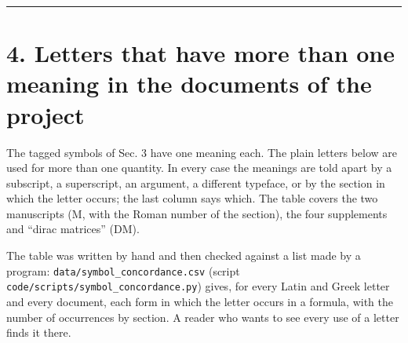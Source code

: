 \documentclass[
  10pt,
]{article}
\begin{document}
\begin{center}\rule{0.5\linewidth}{0.5pt}\end{center}

\hypertarget{letters-that-have-more-than-one-meaning-in-the-documents-of-the-project}{%
\section{4. Letters that have more than one meaning in the documents of
the
project}\label{letters-that-have-more-than-one-meaning-in-the-documents-of-the-project}}

The tagged symbols of Sec. 3 have one meaning each. The plain letters
below are used for more than one quantity. In every case the meanings
are told apart by a subscript, a superscript, an argument, a different
typeface, or by the section in which the letter occurs; the last column
says which. The table covers the two manuscripts (M, with the Roman
number of the section), the four supplements and ``dirac matrices''
(DM).

The table was written by hand and then checked against a list made by a
program: \texttt{data/symbol\_concordance.csv} (script
\texttt{code/scripts/symbol\_concordance.py}) gives, for every Latin and
Greek letter and every document, each form in which the letter occurs in
a formula, with the number of occurrences by section. A reader who wants
to see every use of a letter finds it there.
\end{document}
